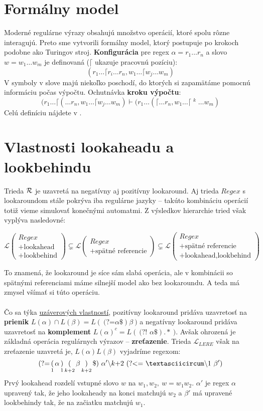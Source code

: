 \documentclass[myposter,portrait,plainboxedsections]{sciposter}
\def\R{{\cal R}} %
\def\L{\mathscr{L}} %
\def\re{Regex}
\def\lel{\mathscr{L}_{LERE}}
\def\lookahead{\text{(?=}}
\def\nlookahead{\text{(?!~}}
\def\lookbehind{\text{(?\textless =}}
\def\mysection#1{
{\color{sectionCol}\section*{\sc\bfseries #1}}}
\begin{document}
\begin{multicols*}{3}
\mysection{Formálny model} 
Moderné regulárne výrazy obsahujú množstvo operácií, ktoré spolu rôzne interagujú. Preto sme vytvorili formálny model, ktorý postupuje po krokoch podobne ako Turingov stroj. \textbf{Konfigurácia} pre regex $\alpha=r_1\dots r_n$ a slovo $w=w_1\dots w_m$ je definovaná ($\lceil$ ukazuje pracovnú pozíciu):
$$(r_1\dots \lceil r_i \dots r_n, w_1 \dots \lceil w_j \dots w_m)$$
V symboly v slove majú niekoľko poschodí, do ktorých si zapamätáme pomocnú informáciu počas výpočtu. Ochutnávka \textbf{kroku výpočtu}:
 $$\displaystyle (r_1 \dots \lceil ( \dots r_n, w_1 \dots \lceil w_j \dots w_m) \vdash (r_1 \dots (\lceil \dots r_n, w_1 \dots \lceil \mathop{w_j}^k \dots w_m)$$
Celú definíciu nájdete v \cite{mojaDip}.

\mysection{Vlastnosti lookaheadu a lookbehindu}

Trieda $\R$ je uzavretá na negatívny aj pozitívny lookaround. Aj trieda $\re$ s lookaroundom stále pokrýva iba regulárne jazyky -- takúto kombináciu operácií totiž vieme simulovať konečnými automatmi. Z výsledkov hierarchie tried však vyplýva nasledovné:

$$ \L \begin{pmatrix}
\re \\
\text{+lookahead} \\
\text{+lookbehind}
\end{pmatrix} 
\subsetneq
\L \begin{pmatrix}
\re \\
\text{+spätné referencie}
\end{pmatrix} 
\subsetneq
\L \begin{pmatrix}
\re \\
\text{+spätné referencie} \\
\text{+lookahead,lookbehind}
\end{pmatrix} 
$$

To znamená, že lookaround je síce sám slabá operácia, ale v kombinácii so spätnými referenciami máme silnejší model ako bez lookaroundu. A teda má zmysel všímať si túto operáciu.
\\ \\ 
Čo sa týka \underline{uzáverových vlastností}, pozitívny lookaround pridáva uzavretosť na \textbf{prienik} $L(\alpha)\cap L(\beta) = L(~\lookahead\alpha\$)\beta~)$ a negatívny lookaround pridáva uzavretosť na \textbf{komplement} $L(\alpha)^c = L(~ \nlookahead \alpha \$).* ~)$. Avšak ohrozená je základná operácia regulárnych výrazov -- \textbf{zreťazenie}. Trieda $\lel$ však na zreťazenie uzavretá je, $L(\alpha)L(\beta)$ vyjadríme regexom:
$$
\lookahead \mathop(_1 \alpha \mathop)_1 \mathop(_{k+2}\beta \mathop)_{k+2} \mathdollar) ~\alpha ' \backslash k\text{+2}~ \lookbehind ~\textasciicircum\backslash 1~\beta ')
$$
Prvý lookahead rozdelí vstupné slovo $w$ na $w_1,w_2,~w=w_1w_2$. $\alpha'$ je regex $\alpha$ upravený tak, že jeho lookaheady na konci matchujú $w_2$ a $\beta'$ má upravené lookbehindy tak, že na začiatku matchujú $w_1$. \cite{mojaBak}
 

\end{multicols*}
\end{document}
